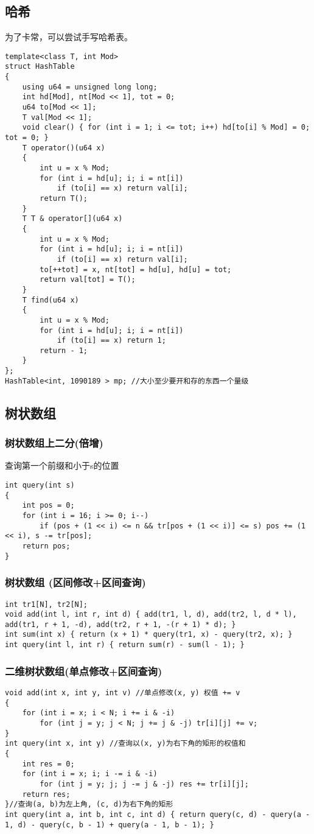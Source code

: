 \documentclass[a4paper, fontset=none]{ctexart}
\begin{document}
\subsection{哈希}
为了卡常，可以尝试手写哈希表。
\begin{verbatim}
template<class T, int Mod>
struct HashTable
{
    using u64 = unsigned long long;
    int hd[Mod], nt[Mod << 1], tot = 0;
    u64 to[Mod << 1];
    T val[Mod << 1];
    void clear() { for (int i = 1; i <= tot; i++) hd[to[i] % Mod] = 0; tot = 0; }
    T operator()(u64 x)
    {
        int u = x % Mod;
        for (int i = hd[u]; i; i = nt[i])
            if (to[i] == x) return val[i];
        return T();
    }
    T T & operator[](u64 x)
    {
        int u = x % Mod;
        for (int i = hd[u]; i; i = nt[i])
            if (to[i] == x) return val[i];
        to[++tot] = x, nt[tot] = hd[u], hd[u] = tot;
        return val[tot] = T();
    }
    T find(u64 x)
    {
        int u = x % Mod;
        for (int i = hd[u]; i; i = nt[i])
            if (to[i] == x) return 1;
        return - 1;
    }
};
HashTable<int, 1090189 > mp; //大小至少要开和存的东西一个量级
\end{verbatim}
\subsection{树状数组}
\subsubsection{树状数组上二分(倍增)}

查询第一个前缀和小于s的位置

\begin{verbatim}
int query(int s)
{
    int pos = 0;
    for (int i = 16; i >= 0; i--)
        if (pos + (1 << i) <= n && tr[pos + (1 << i)] <= s) pos += (1 << i), s -= tr[pos];
    return pos;
}
\end{verbatim}
\subsubsection{树状数组 (区间修改+区间查询)}
\begin{verbatim}
int tr1[N], tr2[N];
void add(int l, int r, int d) { add(tr1, l, d), add(tr2, l, d * l), add(tr1, r + 1, -d), add(tr2, r + 1, -(r + 1) * d); }
int sum(int x) { return (x + 1) * query(tr1, x) - query(tr2, x); }
int query(int l, int r) { return sum(r) - sum(l - 1); }
\end{verbatim}
\subsubsection{二维树状数组(单点修改+区间查询)}
\begin{verbatim}
void add(int x, int y, int v) //单点修改(x, y) 权值 += v
{
    for (int i = x; i < N; i += i & -i)
        for (int j = y; j < N; j += j & -j) tr[i][j] += v;
}
int query(int x, int y) //查询以(x, y)为右下角的矩形的权值和
{
    int res = 0;
    for (int i = x; i; i -= i & -i)
        for (int j = y; j; j -= j & -j) res += tr[i][j];
    return res;
}//查询(a, b)为左上角, (c, d)为右下角的矩形
int query(int a, int b, int c, int d) { return query(c, d) - query(a - 1, d) - query(c, b - 1) + query(a - 1, b - 1); }
\end{verbatim}
\end{document}
